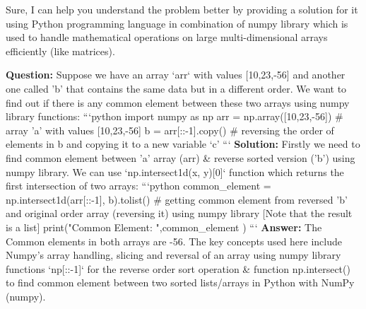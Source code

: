 Sure, I can help you understand the problem better by providing a solution for it using Python programming language in combination of numpy library which is used to handle mathematical operations on large multi-dimensional arrays efficiently (like matrices). 

\textbf{Question:} Suppose we have an array `arr` with values [10,23,-56] and another one called 'b' that contains the same data but in a different order. We want to find out if there is any common element between these two arrays using numpy library functions:
```python 
import numpy as np  
arr = np.array([10,23,-56])    # array 'a' with values [10,23,-56]    
b  = arr[::-1].copy()           # reversing the order of elements in b and copying it to a new variable ‘c’  
```                                                      
\textbf{Solution:}                                                                                           
Firstly we need to find common element between 'a' array (arr) & reverse sorted version ('b') using numpy library. We can use `np.intersect1d(x, y)[0]` function which returns the first intersection of two arrays: 
```python  
common_element = np.intersect1d(arr[::-1], b).tolist()    # getting common element from reversed 'b' and original order array (reversing it) using numpy library     [Note that the result is a list]     
print("Common Element: ",common_element ) 
```                                                                                                          
\textbf{Answer:} The Common elements in both arrays are -56.  
The key concepts used here include Numpy's array handling, slicing and reversal of an array using numpy library functions `np[::-1]` for the reverse order sort operation & function np.intersect() to find common element between two sorted lists/arrays in Python with NumPy (numpy).
